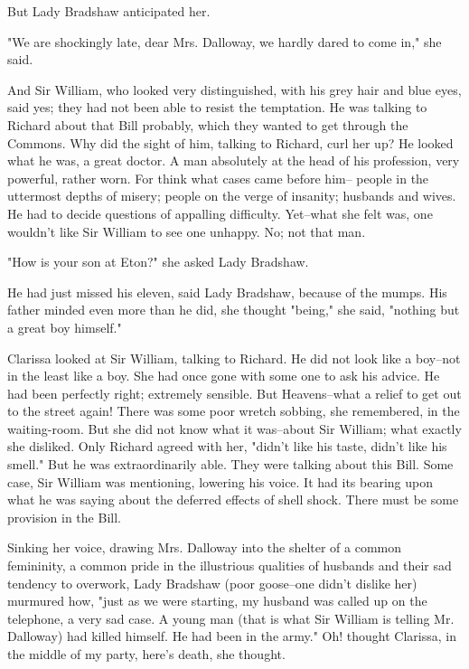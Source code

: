 \documentclass[lang=cn,10pt]{elegantbook}
\begin{document}
But Lady Bradshaw anticipated her.

"We are shockingly late, dear Mrs. Dalloway, we hardly dared to
come in," she said.

And Sir William, who looked very distinguished, with his grey hair
and blue eyes, said yes; they had not been able to resist the
temptation.  He was talking to Richard about that Bill probably,
which they wanted to get through the Commons.  Why did the sight of
him, talking to Richard, curl her up?  He looked what he was, a
great doctor.  A man absolutely at the head of his profession, very
powerful, rather worn.  For think what cases came before him--
people in the uttermost depths of misery; people on the verge of
insanity; husbands and wives.  He had to decide questions of
appalling difficulty.  Yet--what she felt was, one wouldn't like
Sir William to see one unhappy.  No; not that man.

"How is your son at Eton?" she asked Lady Bradshaw.

He had just missed his eleven, said Lady Bradshaw, because of the
mumps.  His father minded even more than he did, she thought
"being," she said, "nothing but a great boy himself."

Clarissa looked at Sir William, talking to Richard.  He did not
look like a boy--not in the least like a boy.  She had once gone
with some one to ask his advice.  He had been perfectly right;
extremely sensible.  But Heavens--what a relief to get out to the
street again!  There was some poor wretch sobbing, she remembered,
in the waiting-room.  But she did not know what it was--about Sir
William; what exactly she disliked.  Only Richard agreed with her,
"didn't like his taste, didn't like his smell."  But he was
extraordinarily able.  They were talking about this Bill.  Some
case, Sir William was mentioning, lowering his voice.  It had its
bearing upon what he was saying about the deferred effects of shell
shock.  There must be some provision in the Bill.

Sinking her voice, drawing Mrs. Dalloway into the shelter of a
common femininity, a common pride in the illustrious qualities of
husbands and their sad tendency to overwork, Lady Bradshaw (poor
goose--one didn't dislike her) murmured how, "just as we were
starting, my husband was called up on the telephone, a very sad
case.  A young man (that is what Sir William is telling Mr.
Dalloway) had killed himself.  He had been in the army."  Oh!
thought Clarissa, in the middle of my party, here's death, she
thought.
\end{document}
